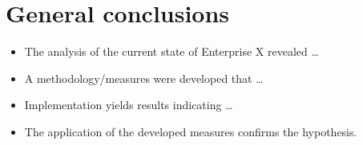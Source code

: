 \chapter{General conclusions}
\begin{itemize}
  \item The analysis of the current state of Enterprise X revealed \dots
  \item A methodology/measures were developed that \dots
  \item Implementation yields results indicating \dots
  \item The application of the developed measures confirms the hypothesis.
\end{itemize}
